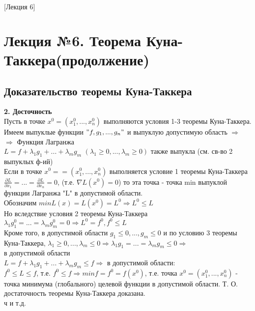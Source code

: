 [Лекция 6]

\newpage

\section{Лекция №6. Теорема Куна-Таккера(продолжение)}
\subsection{Доказательство теоремы Куна-Таккера}
\textbf{2. Досточность}\\
Пусть в точке $x^0 = (x_1^0, ..., x_n^0)$ выполняются условия 1-3 теоремы Куна-Таккера. \\
Имеем выпуклые функции $"f, g_1, ..., g_n"$ и выпуклую допустимую область $\Rightarrow$ \\
$\Rightarrow$ Функция Лагранжа \\
$L = f + \lambda_1g_1 + ... + \lambda_m g_m$ $(\lambda_1 \geqslant 0, ..., \lambda_m \geqslant 0)$ также выпукла (см. св-во 2 выпуклых ф-ий) \\
Если в точке $x^0 = = (x_1^0, ..., x_n^0)$ выполняется условие 1 теоремы Куна-Таккера
$\frac{\partial L}{\partial x_1} = ... = \frac{\partial L}{\partial x_n} = 0$, (т.е. $\nabla L (x^0) = 0$) то эта точка - точка min выпуклой функции Лагранжа "L" в допустимой области. \\
Обозначим $min L(x) = L (x^0) = L^0 \Rightarrow L^0 \leqslant L$ \\
Но вследствие условия 2 теоремы Куна-Таккера \\
$\lambda_1 g_1^0 = ... = \lambda_m g_m^0 = 0 \Rightarrow L^0 = f^0, f^0 \leqslant L$ \\
Кроме того, в допустимой области $g_1 \leqslant 0, ..., g_m \leqslant 0$ и по условию 3 теоремы Куна-Таккера, $\lambda_1 \geqslant 0, ..., \lambda_m \leqslant 0 \Rightarrow \lambda_1 g_1 = ... = \lambda_m g_m \leqslant 0 \Rightarrow$ \\
в допустимой области \\
$L = f + \lambda_1 g_1 + ... + \lambda_m g_m \leqslant f \Rightarrow$ в допустимой области: \\
$f^0 \leqslant L \leqslant f$, т.е. $f^0 \leqslant f \Rightarrow min f = f^0 = f(x^0)$, т.е. точка $x^0 = (x_1^0, ..., x_n^0)$
- точка минимума (глобального) целевой функции в допустимой области. 
Т. О. достаточность теоремы Куна-Таккера доказана. \\
ч и т.д. 
